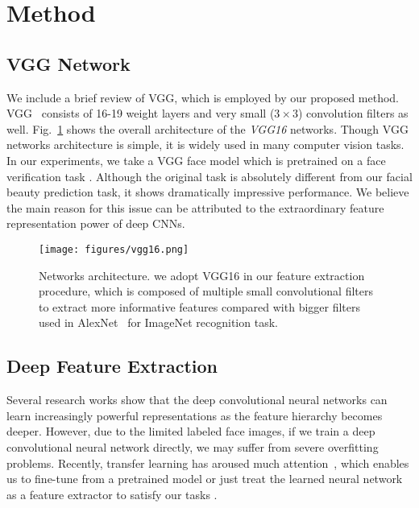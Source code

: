 \documentclass[a4paper,conference]{IEEEtran}
\begin{document}
\section{Method}

 \subsection{VGG Network}
    We include a brief review of VGG, which is employed by our proposed method.
    VGG~\cite{simonyan2014very} consists of 16-19 weight layers and very small
    ($3\times3$) convolution filters as well.
    Fig.~\ref{vgg16} shows the overall architecture of the \emph{VGG16} networks.
    Though VGG networks architecture is simple, it is widely used in many
    computer vision tasks. In our experiments, we take a VGG face model which is
    pretrained on a face verification task \cite{parkhi2015deep}.
    Although the original task is absolutely different from our facial beauty
    prediction task, it shows dramatically impressive performance.
    We believe the main reason for this issue can be attributed to the
    extraordinary feature representation power of deep CNNs.


    \begin{figure}[!htb]
      \centering
      \texttt{[image: figures/vgg16.png]}
      \caption{Networks architecture. we adopt VGG16 in our feature extraction
      procedure, which is composed of multiple small convolutional filters to
      extract more informative features compared with bigger filters used in
      AlexNet~\cite{krizhevsky2012imagenet} for ImageNet recognition task.}
      \label{vgg16}
    \end{figure}


  \subsection{Deep Feature Extraction}
    Several research works \cite{bengio2012deep,lecun2015deep} show
    that the deep convolutional neural networks can learn increasingly powerful
    representations as the feature hierarchy becomes deeper. However,
    due to the limited labeled face images, if we train a deep convolutional
    neural network directly, we may suffer from severe overfitting problems.
    Recently, transfer learning has aroused much attention~\cite{Yuan18}, which
    enables us to fine-tune from a pretrained model or just treat the learned
    neural network as a feature extractor to satisfy our tasks
    \cite{yosinski2014transferable}.
\end{document}
